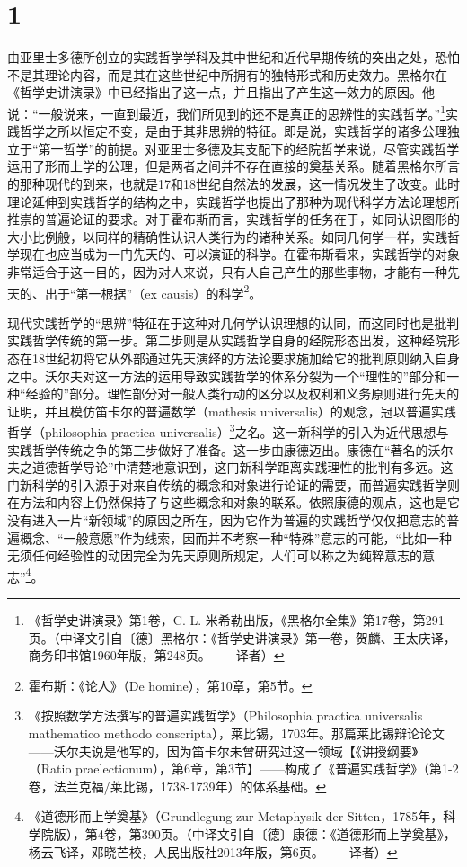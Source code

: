 \section*{1}

由亚里士多德所创立的实践哲学学科及其中世纪和近代早期传统的突出之处，恐怕不是其理论内容，而是其在这些世纪中所拥有的独特形式和历史效力。黑格尔在《哲学史讲演录》中已经指出了这一点，并且指出了产生这一效力的原因。他说：“一般说来，一直到最近，我们所见到的还不是真正的思辨性的实践哲学。”\footnote{《哲学史讲演录》第1卷，C. L. 米希勒出版，《黑格尔全集》第17卷，第291页。（中译文引自〔德〕黑格尔：《哲学史讲演录》第一卷，贺麟、王太庆译，商务印书馆1960年版，第248页。——译者）}实践哲学之所以恒定不变，是由于其非思辨的特征。即是说，实践哲学的诸多公理独立于“第一哲学”的前提。对亚里士多德及其支配下的经院哲学来说，尽管实践哲学运用了形而上学的公理，但是两者之间并不存在直接的奠基关系。随着黑格尔所言的那种现代的到来，也就是17和18世纪自然法的发展，这一情况发生了改变。此时理论延伸到实践哲学的结构之中，实践哲学也提出了那种为现代科学方法论理想所推崇的普遍论证的要求。对于霍布斯而言，实践哲学的任务在于，如同认识图形的大小比例般，以同样的精确性认识人类行为的诸种关系。如同几何学一样，实践哲学现在也应当成为一门先天的、可以演证的科学。在霍布斯看来，实践哲学的对象非常适合于这一目的，因为对人来说，只有人自己产生的那些事物，才能有一种先天的、出于“第一根据”（ex causis）的科学\footnote{霍布斯：《论人》（De homine），第10章，第5节。}。

现代实践哲学的“思辨”特征在于这种对几何学认识理想的认同，而这同时也是批判实践哲学传统的第一步。第二步则是从实践哲学自身的经院形态出发，这种经院形态在18世纪初将它从外部通过先天演绎的方法论要求施加给它的批判原则纳入自身之中。沃尔夫对这一方法的运用导致实践哲学的体系分裂为一个“理性的”部分和一种“经验的”部分。理性部分对一般人类行动的区分以及权利和义务原则进行先天的证明，并且模仿笛卡尔的普遍数学（mathesis universalis）的观念，冠以普遍实践哲学（philosophia practica universalis）\footnote{《按照数学方法撰写的普遍实践哲学》（Philosophia practica universalis mathematico methodo conscripta），莱比锡，1703年。那篇莱比锡辩论论文——沃尔夫说是他写的，因为笛卡尔未曾研究过这一领域【《讲授纲要》（Ratio praelectionum），第6章，第3节】——构成了《普遍实践哲学》（第1-2卷，法兰克福/莱比锡，1738-1739年）的体系基础。}之名。这一新科学的引入为近代思想与实践哲学传统之争的第三步做好了准备。这一步由康德迈出。康德在“著名的沃尔夫之道德哲学导论”中清楚地意识到，这门新科学距离实践理性的批判有多远。这门新科学的引入源于对来自传统的概念和对象进行论证的需要，而普遍实践哲学则在方法和内容上仍然保持了与这些概念和对象的联系。依照康德的观点，这也是它没有进入一片“新领域”的原因之所在，因为它作为普遍的实践哲学仅仅把意志的普遍概念、“一般意愿”作为线索，因而并不考察一种“特殊”意志的可能，“比如一种无须任何经验性的动因完全为先天原则所规定，人们可以称之为纯粹意志的意志”\footnote{《道德形而上学奠基》（Grundlegung zur Metaphysik der Sitten，1785年，科学院版），第4卷，第390页。（中译文引自〔德〕康德：《道德形而上学奠基》，杨云飞译，邓晓芒校，人民出版社2013年版，第6页。——译者）}。

